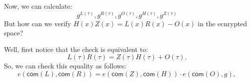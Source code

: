 \documentclass{zkdl-presentation-template}
\begin{document}
    \begin{frame}
        Now, we can calculate:
        \begin{equation*}
            g^{L(\tau)}, g^{R(\tau)}, g^{O(\tau)}, g^{H(\tau)}, g^{Z(\tau)}
        \end{equation*}
        But how can we verify $H(x)Z(x) = L(x)R(x) - O(x)$ in the ecnrypted space? 
        
        Well, first notice that the check is equivalent to:
        \begin{equation*}
            L(\tau)R(\tau) = Z(\tau)H(\tau) + O(\tau).
        \end{equation*}
        So, we can check this equality as follows:
        \begin{equation*}
            e(\mathsf{com}(L), \mathsf{com}(R)) = e(\mathsf{com}(Z), \mathsf{com}(H)) \cdot e(\mathsf{com}(O), g),
        \end{equation*}
    \end{frame}
\end{document}
